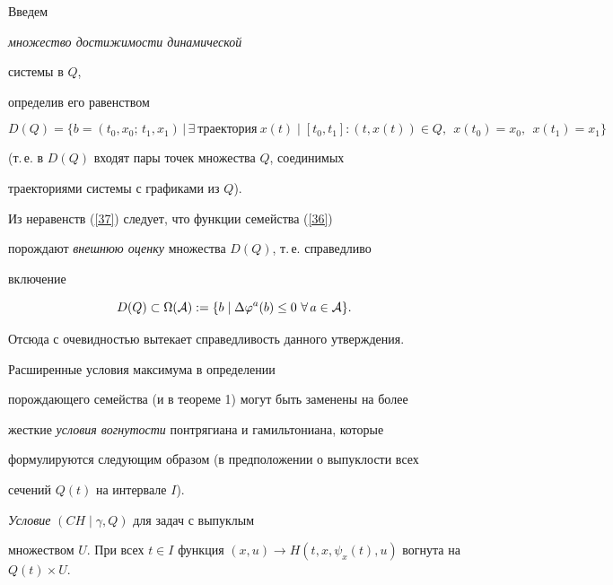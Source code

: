 \begin{pf}


Введем {\em множество достижимости динамической


системы в $Q$,} определив его равенством


$$


D(Q)=\{b=(t_0, x_0 ;\,t_1, x_1)\,\big|\, \exists\ \text{траектория}


\ x(t)\mid \left[t_0, t_1 \right] :


(t, x(t))\in Q,\ \ x(t_0)=x_0,\ \ x(t_1)=x_1 \}


$$


(т.\,е. в $D(Q)$ входят пары точек множества $Q$, соединимых


траекториями системы с графиками из $Q$).





Из неравенств (\ref{37}) следует, что функции семейства (\ref{36})


порождают {\em внешнюю оценку} множества $D(Q)$, т.\,е. справедливо


включение


$$


D(Q)\subset \Omega ({\cal A}):=\{b\mid \Delta\varphi^a (b)\leq 0


\ \forall\, a\in {\cal A}\}.


$$


Отсюда с очевидностью вытекает справедливость данного утверждения.


\end{pf}





Расширенные условия максимума в определении


порождающего семейства (и в теореме 1) могут быть заменены на более


жесткие {\em условия вогнутости} понтрягиана и гамильтониана, которые


формулируются следующим образом (в предположении о выпуклости всех


сечений $Q(t)$ на интервале $I$).


\medskip





{\it Условие} $(CH\mid \gamma,Q)$ для задач с выпуклым


множеством $U$. При всех $t\in I$ функция $(x,u)\rightarrow


H(t,x,\psi_x (t),u)$ вогнута на $Q(t)\times U$.



